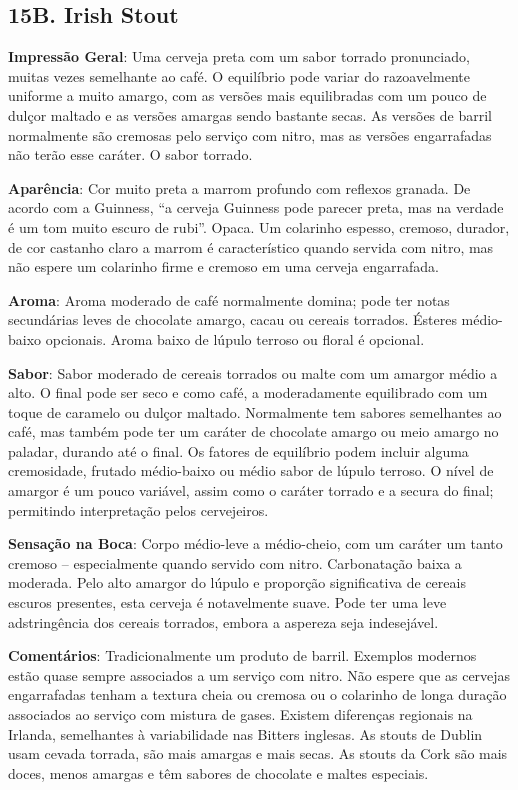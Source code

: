 \subsection*{15B. Irish Stout}

\textbf{Impressão Geral}: Uma cerveja preta com um sabor torrado pronunciado, muitas vezes semelhante ao café. O equilíbrio pode variar do razoavelmente uniforme a muito amargo, com as versões mais equilibradas com um pouco de dulçor maltado e as versões amargas sendo bastante secas. As versões de barril normalmente são cremosas pelo serviço com nitro, mas as versões engarrafadas não terão esse caráter. O sabor torrado.

\textbf{Aparência}: Cor muito preta a marrom profundo com reflexos granada. De acordo com a Guinness, “a cerveja Guinness pode parecer preta, mas na verdade é um tom muito escuro de rubi”. Opaca. Um colarinho espesso, cremoso, durador, de cor castanho claro a marrom é característico quando servida com nitro, mas não espere um colarinho firme e cremoso em uma cerveja engarrafada.

\textbf{Aroma}: Aroma moderado de café normalmente domina; pode ter notas secundárias leves de chocolate amargo, cacau ou cereais torrados. Ésteres médio-baixo opcionais. Aroma baixo de lúpulo terroso ou floral é opcional.

\textbf{Sabor}: Sabor moderado de cereais torrados ou malte com um amargor médio a alto. O final pode ser seco e como café, a moderadamente equilibrado com um toque de caramelo ou dulçor maltado. Normalmente tem sabores semelhantes ao café, mas também pode ter um caráter de chocolate amargo ou meio amargo no paladar, durando até o final. Os fatores de equilíbrio podem incluir alguma cremosidade, frutado médio-baixo ou médio sabor de lúpulo terroso. O nível de amargor é um pouco variável, assim como o caráter torrado e a secura do final; permitindo interpretação pelos cervejeiros.

\textbf{Sensação na Boca}: Corpo médio-leve a médio-cheio, com um caráter um tanto cremoso – especialmente quando servido com nitro. Carbonatação baixa a moderada. Pelo alto amargor do lúpulo e proporção significativa de cereais escuros presentes, esta cerveja é notavelmente suave. Pode ter uma leve adstringência dos cereais torrados, embora a aspereza seja indesejável.

\textbf{Comentários}: Tradicionalmente um produto de barril. Exemplos modernos estão quase sempre associados a um serviço com nitro. Não espere que as cervejas engarrafadas tenham a textura cheia ou cremosa ou o colarinho de longa duração associados ao serviço com mistura de gases. Existem diferenças regionais na Irlanda, semelhantes à variabilidade nas Bitters inglesas. As stouts de Dublin usam cevada torrada, são mais amargas e mais secas. As stouts da Cork são mais doces, menos amargas e têm sabores de chocolate e maltes especiais.

